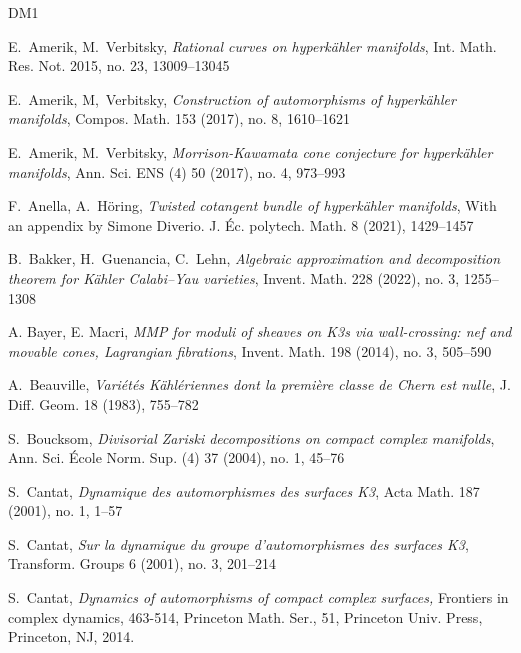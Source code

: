 \documentclass[11pt]{article}
\newcommand{\6}{\partial}
\begin{document}
{\small
\begin{thebibliography}{DM1}

E.\ Amerik, M.\ Verbitsky, {\it Rational curves on hyperk\"ahler manifolds},
Int. Math. Res. Not. 2015, no. 23, 13009--13045


E.\ Amerik, M,\ Verbitsky, {\it Construction of automorphisms of hyperk\"ahler manifolds},
Compos. Math. 153 (2017), no. 8, 1610--1621

E.\ Amerik, M.\ Verbitsky, {\it Morrison-Kawamata cone conjecture for hyperk\"ahler manifolds},
Ann. Sci. ENS (4) 50 (2017), no. 4, 973--993

F.\ Anella, A.\ H\"oring, {\it Twisted cotangent bundle of hyperk\"ahler manifolds},
With an appendix by Simone Diverio. J. \'Ec. polytech. Math. 8 (2021), 1429--1457

B.\ Bakker, H.\ Guenancia, C.\ Lehn, {\it Algebraic approximation and decomposition
theorem for K\"ahler Calabi--Yau varieties},
Invent. Math. 228 (2022), no. 3, 1255--1308

 A. Bayer, E. Macri, 
{\em MMP for moduli of sheaves on K3s via wall-crossing: nef and movable cones,
Lagrangian fibrations}, Invent. Math. 198 (2014), no. 3, 505--590

A.\ Beauville, {\it Vari\'et\'es K\"ahl\'eriennes dont la premi\`ere classe de Chern est nulle},
J. Diff. Geom. 18 (1983), 755--782

S.\ Boucksom, {\it Divisorial Zariski decompositions on compact complex manifolds},
Ann. Sci. \'Ecole Norm. Sup. (4) 37 (2004), no. 1, 45--76

S.\ Cantat, {\it Dynamique des automorphismes des surfaces K3},
Acta Math. 187 (2001), no. 1, 1--57

S.\ Cantat, {\it Sur la dynamique du groupe d'automorphismes des surfaces K3},
Transform. Groups 6 (2001), no. 3, 201--214 

S.\ Cantat,
{\em Dynamics of automorphisms of compact complex surfaces,}
Frontiers in complex dynamics, 463-514,
Princeton Math. Ser., 51, Princeton Univ. Press, Princeton, NJ, 2014. 


\end{thebibliography}}
\end{document}
